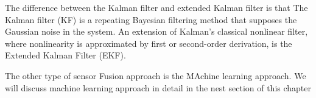 The difference between the Kalman filter and extended Kalman filter is that The Kalman filter (KF) is a repeating Bayesian filtering method that supposes the Gaussian noise in the system. An extension of Kalman's classical nonlinear filter, where nonlinearity is approximated by first or second-order derivation, is the Extended Kalman Filter (EKF).


The other type of sensor Fusion approach is the MAchine learning approach. We will discuss machine learning approach in detail in the nest section of this chapter




